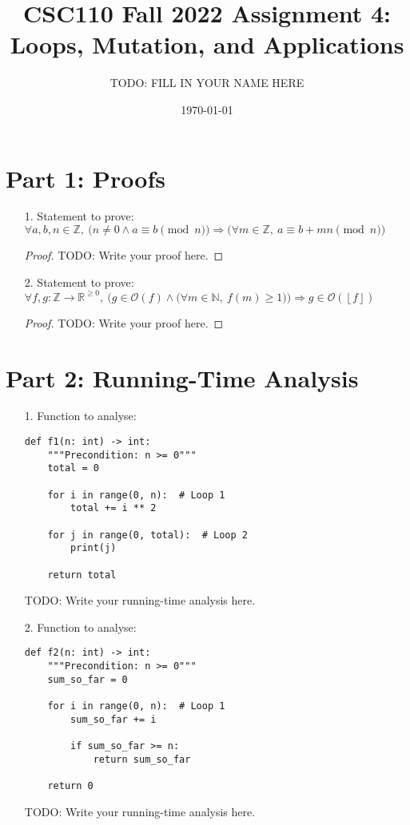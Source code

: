 \documentclass[11pt]{article}
\title{CSC110 Fall 2022 Assignment 4: Loops, Mutation, and Applications}
\author{TODO: FILL IN YOUR NAME HERE}
\date{\today}
\newcommand{\floor}[1]{\left\lfloor #1 \right\rfloor}
\begin{document}
\maketitle


\section*{Part 1: Proofs}

\begin{enumerate}
\item[1.] Statement to prove:
$\forall a, b, n \in \mathbb{Z},~ \big(n \neq 0 \land a \equiv b \pmod n \big) \Rightarrow \big(\forall m \in \mathbb{Z},~ a \equiv b + mn \pmod n\big)$

\begin{proof}
TODO: Write your proof here.
\end{proof}

\newpage

\item[2.] Statement to prove:
$
\forall f, g: \mathbb{Z} \to \mathbb{R}^{\geq 0},~
\Big(g \in \mathcal{O}(f) \land \big(\forall m \in \mathbb{N},~ f(m) \geq 1) \Big) \Rightarrow
g \in \mathcal{O}(\floor{f})
$

\begin{proof}
TODO: Write your proof here.
\end{proof}
\end{enumerate}

\newpage


\section*{Part 2: Running-Time Analysis}

\begin{enumerate}
\item[1.]
Function to analyse:

\begin{verbatim}
def f1(n: int) -> int:
    """Precondition: n >= 0"""
    total = 0

    for i in range(0, n):  # Loop 1
        total += i ** 2

    for j in range(0, total):  # Loop 2
        print(j)

    return total
\end{verbatim}

TODO: Write your running-time analysis here.

\newpage


\item[2.]
Function to analyse:

\begin{verbatim}
def f2(n: int) -> int:
    """Precondition: n >= 0"""
    sum_so_far = 0

    for i in range(0, n):  # Loop 1
        sum_so_far += i

        if sum_so_far >= n:
            return sum_so_far

    return 0
\end{verbatim}

TODO: Write your running-time analysis here.

\end{enumerate}
\end{document}
